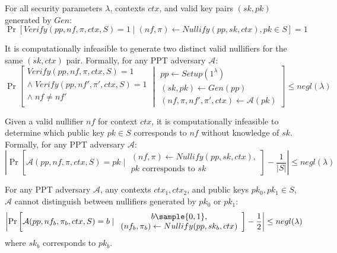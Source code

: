 \begin{property}[Correctness]
For all security parameters $\lambda$, contexts $ctx$, and valid key pairs $(sk, pk)$ generated by $Gen$:
$$\Pr[Verify(pp, nf, \pi, ctx, S) = 1 \mid (nf, \pi) \leftarrow Nullify(pp, sk, ctx), pk \in S] = 1$$
\end{property}

\begin{property}[Uniqueness]
It is computationally infeasible to generate two distinct valid nullifiers for the same $(sk, ctx)$ pair. Formally, for any PPT adversary $\mathcal{A}$:
$$\Pr\left[\begin{array}{c}
Verify(pp, nf, \pi, ctx, S) = 1 \\
\land\; Verify(pp, nf', \pi', ctx, S) = 1 \\
\land\; nf \neq nf' \\
\end{array}
\middle|
\begin{array}{c}
pp \leftarrow Setup(1^\lambda) \\
(sk, pk) \leftarrow Gen(pp) \\
(nf, \pi, nf', \pi', ctx) \leftarrow \mathcal{A}(pk)
\end{array}
\right] \leq negl(\lambda)$$
\end{property}

\begin{property}[Pseudonymity]
Given a valid nullifier $nf$ for context $ctx$, it is computationally infeasible to determine which public key $pk \in S$ corresponds to $nf$ without knowledge of $sk$. Formally, for any PPT adversary $\mathcal{A}$:
$$\left|\Pr\left[\mathcal{A}(pp, nf, \pi, ctx, S) = pk \mid \begin{array}{c} (nf, \pi) \leftarrow Nullify(pp, sk, ctx), \\ pk \text{ corresponds to } sk \end{array}\right] - \frac{1}{|S|}\right| \leq negl(\lambda)$$
\end{property}

\begin{property}[Indistinguishability]
For any PPT adversary $\mathcal{A}$, any contexts $ctx_1, ctx_2$, and public keys $pk_0, pk_1 \in S$, $\mathcal{A}$ cannot distinguish between nullifiers generated by $pk_0$ or $pk_1$:
$$\left|\Pr\left[\mathcal{A}(pp, nf_b, \pi_b, ctx, S) = b \mid \begin{array}{c} b \sample \{0,1\}, \\ (nf_b, \pi_b) \leftarrow Nullify(pp, sk_b, ctx) \end{array}\right] - \frac{1}{2}\right| \leq negl(\lambda)$$
where $sk_b$ corresponds to $pk_b$.
\end{property}


